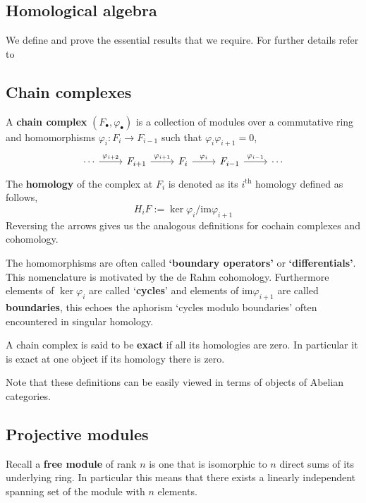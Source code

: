 \documentclass[12pt]{article}
\numberwithin{equation}{section}
\begin{document}
	\begin{appendices}
	\section{Homological algebra}
	We define and prove the essential results that we require. For further details refer to \cite{eisenbud2013commutative, weibel_1994}
	\subsection{Chain complexes}
	A \textbf{chain complex} $(F_\bullet, \varphi_\bullet)$ is a collection of modules over a commutative ring and homomorphisms $\varphi_i: F_i \to F_{i-1}$ such that $\varphi_i \varphi_{i+1}=0$,
	\[\begin{tikzcd}
		\cdots & {F_{i+1}} & {F_i} & {F_{i-1}} & \cdots
		\arrow["{\varphi_{i+1}}", from=1-2, to=1-3]
		\arrow["{\varphi_i}", from=1-3, to=1-4]
		\arrow["{\varphi_{i-1}}", from=1-4, to=1-5]
		\arrow["{\varphi_{i+2}}", from=1-1, to=1-2]
	\end{tikzcd}\]
	The \textbf{homology} of the complex at $F_i$ is denoted as its $i^{\mathrm{th}}$ homology defined as follows,
	\[ H_iF := \ker \varphi_i/ \mathrm{im} \varphi_{i+1} \]
	Reversing the arrows gives us the analogous definitions for cochain complexes and cohomology.
	
	The homomorphisms are often called \textbf{`boundary operators'} or \textbf{`differentials'}. This nomenclature is motivated by the de Rahm cohomology. Furthermore elements of $\ker \varphi_i$ are called `\textbf{cycles}' and elements of $\mathrm{im} \varphi_{i+1}$ are called \textbf{boundaries}, this echoes the aphorism `cycles modulo boundaries' often encountered in singular homology.
	
	A chain complex is said to be \textbf{exact} if all its homologies are zero. In particular it is exact at one object if its homology there is zero.
	
	Note that these definitions can be easily viewed in terms of objects of Abelian categories.
	
	\subsection{Projective modules}
	Recall a\textbf{ free module } of rank $n$ is one that is isomorphic to $n$ direct sums of its underlying ring. In particular this means that there exists a linearly independent spanning set of the module with $n$ elements.
	

\end{appendices}
\end{document}
